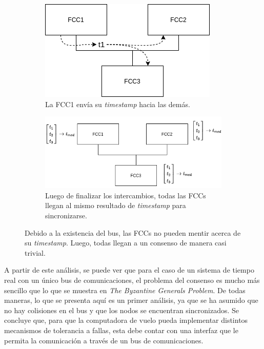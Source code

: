 \begin{figure}[H]
    \centering
    \begin{subfigure}[b]{0.34\textwidth}
        \includegraphics[width=\textwidth]{img/byzantine_bus_2.png}
        \caption{La FCC1 envía su \textit{timestamp} hacia las demás.}
        \label{fig:byzantine_bus_2}
    \end{subfigure}\hfill
    \begin{subfigure}[b]{0.49\textwidth}
        \includegraphics[width=\textwidth]{img/byzantine_bus_3.png}
        \caption{Luego de finalizar los intercambios, todas las FCCs llegan al mismo resultado de \textit{timestamp} para sincronizarse.}
        \label{fig:byzantine_bus_3}
    \end{subfigure}
    \caption{Debido a la existencia del bus, las FCCs no pueden mentir acerca de su \textit{timestamp}. Luego, todas llegan a un consenso de manera casi trivial.}
    \label{}
\end{figure}

A partir de este análisis, se puede ver que para el caso de un sistema de tiempo real con un único bus de comunicaciones, el problema del consenso es mucho más sencillo que lo que se muestra en \textit{The Byzantine Generals Problem}. De todas maneras, lo que se presenta aquí es un primer análisis, ya que se ha asumido que no hay colisiones en el bus y que los nodos se encuentran sincronizados. Se concluye que, para que la computadora de vuelo pueda implementar distintos mecanismos de tolerancia a fallas, esta debe contar con una interfaz que le permita la comunicación a través de un bus de comunicaciones.\\


